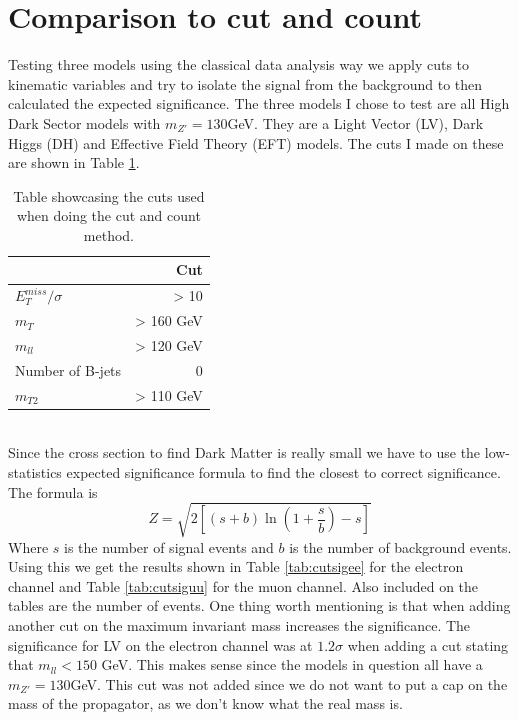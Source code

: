 \documentclass[14pt, a4paper]{book}
\begin{document}
\section{Comparison to cut and count}
Testing three models using the classical data analysis way we apply cuts to kinematic variables and try to isolate the signal from the background to then calculated the expected significance. The three models I chose to test are all High Dark Sector models with $m_{Z'}=130$GeV. They are a Light Vector (LV), Dark Higgs (DH) and Effective Field Theory (EFT) models. The cuts I made on these are shown in Table \ref{tab:cuts}.
\begin{table}[!h]
    \centering
    \begin{tabular}{l|r}\midrule\midrule
                                & Cut\\\midrule
         $E_T^{miss}/\sigma$    & > 10      \\
         $m_T$                  & > 160 GeV \\
         $m_{ll}$               & > 120 GeV \\
         Number of B-jets       & 0         \\
         $m_{T2}$               & > 110 GeV \\\midrule\midrule
    \end{tabular}
    \caption[Cut and count cuts]{Table showcasing the cuts used when doing the cut and count method.}
    \label{tab:cuts}
\end{table}
\\ Since the cross section to find Dark Matter is really small we have to use the low-statistics expected significance formula to find the closest to correct significance. The formula is
\begin{equation}\label{eq:low_stat_Z}
    Z = \sqrt{2\left[(s + b)\ln(1 + \frac{s}{b}) - s \right]}
\end{equation}
Where $s$ is the number of signal events and $b$ is the number of background events. Using this we get the results shown in Table \ref{tab:cutsigee} for the electron channel and Table \ref{tab:cutsiguu} for the muon channel. Also included on the tables are the number of events. One thing worth mentioning is that when adding another cut on the maximum invariant mass increases the significance. The significance for LV on the electron channel was at $1.2\sigma$ when adding a cut stating that $m_{ll}<150$ GeV. This makes sense since the models in question all have a $m_{Z'}=130$GeV. This cut was not added since we do not want to put a cap on the mass of the propagator, as we don't know what the real mass is.
\end{document}

